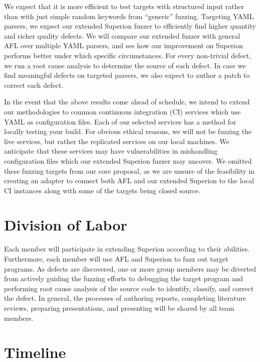 \documentclass[12pt]{diazessay}
\begin{document}
We expect that it is more efficient to test targets with structured input rather than with just simple random keywords from ``generic'' fuzzing.
Targeting YAML parsers, we expect our extended Superion fuzzer to efficiently find higher quantity and richer quality defects.
We will compare our extended fuzzer with general AFL over multiple YAML parsers, and see how our improvement on Superion performs better under which specific circumstances.
For every non-trivial defect, we run a root cause analysis to determine the source of each defect.
In case we find meaningful defects on targeted parsers, we also expect to author a patch to correct each defect.

In the event that the above results come ahead of schedule, we intend to extend our methodologies to common continuous integration (CI\cite{cicd}) services\cite{trevisci}\cite{circleci}\cite{jeninks} which use YAML as configuration files.
Each of our selected services has a method for locally testing your build.
For obvious ethical reasons, we will not be fuzzing the live services, but rather the replicated services on our local machines.
We anticipate that these services may have vulnerabilities in mishandling configuration files which our extended Superion fuzzer may uncover.
We omitted these fuzzing targets from our core proposal, as we are unsure of the feasibility in creating an adapter to connect both AFL and our extended Superion to the local CI instances along with some of the targets being closed source.


\section*{Division of Labor}

Each member will participate in extending Superion according to their abilities.
Furthermore, each member will use AFL and Superion to fuzz out target programs.
As defects are discovered, one or more group members may be diverted from actively guiding the fuzzing efforts to debugging the target program and performing root cause analysis of the source code to identify, classify, and correct the defect.
In general, the processes of authoring reports, completing literature reviews, preparing presentations, and presenting will be shared by all team members.


\section*{Timeline}
\end{document}
